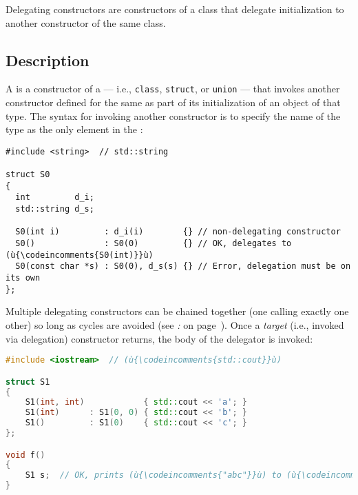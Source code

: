 

Delegating constructors are constructors of a class that delegate initialization to another
constructor of the same class.

\subsection[Description]{Description}\label{description}

A  is a constructor of a
 --- i.e., \lstinline!class!, \lstinline!struct!, or
\lstinline!union! --- that invokes another constructor defined for the same
 as part of its initialization of an object of that type.
The syntax for invoking another constructor is to specify
the name of the type as the only element in the :

%
\begin{lstlisting}
#include <string>  // std::string

struct S0
{
  int         d_i;
  std::string d_s;

  S0(int i)         : d_i(i)        {} // non-delegating constructor
  S0()              : S0(0)         {} // OK, delegates to (ù{\codeincomments{S0(int)}}ù)
  S0(const char *s) : S0(0), d_s(s) {} // Error, delegation must be on its own
};
\end{lstlisting}

\noindent Multiple delegating constructors can be chained together (one calling
exactly one other) so long as cycles are avoided (see
{\it{}:} {\it{}} on page~\pageref{delegation-cycles}). Once a \emph{target} (i.e., invoked via delegation) constructor returns,
the body of the delegator is invoked:

\begin{lstlisting}[language=C++]
#include <iostream>  // (ù{\codeincomments{std::cout}}ù)

struct S1
{
    S1(int, int)            { std::cout << 'a'; }
    S1(int)      : S1(0, 0) { std::cout << 'b'; }
    S1()         : S1(0)    { std::cout << 'c'; }
};

void f()
{
    S1 s;  // OK, prints (ù{\codeincomments{"abc"}}ù) to (ù{\codeincomments{stdout}}ù)
}
\end{lstlisting}

